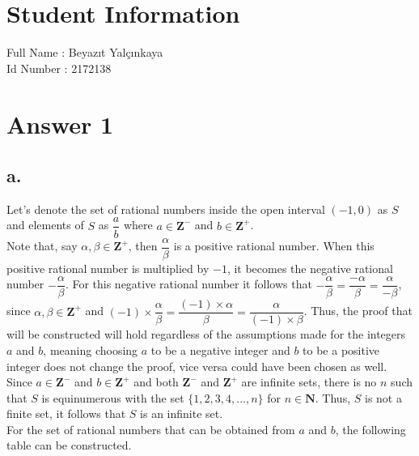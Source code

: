\documentclass[12pt]{article}
\begin{document}
\section*{Student Information } 
Full Name : Beyazıt Yalçınkaya \\
Id Number : 2172138 \\

\section*{Answer 1}

\subsection*{a.}
Let's denote the set of rational numbers inside the open interval $(-1, 0)$ as $S$ and elements of $S$ as $\dfrac{a}{b}$ where $a \in \mathbf{Z}^{-}$ and $b \in \mathbf{Z}^{+}$. \\
Note that, say $\alpha, \beta \in \mathbf{Z}^{+}$, then $\dfrac{\alpha}{\beta}$ is a positive rational number. When this positive rational number is multiplied by $-1$, it becomes the negative rational number $-\dfrac{\alpha}{\beta}$. For this negative rational  number it follows that $-\dfrac{\alpha}{\beta} = \dfrac{-\alpha}{\beta} = \dfrac{\alpha}{-\beta}$, since $\alpha, \beta \in \mathbf{Z}^{+}$ and $(-1) \times \dfrac{\alpha}{\beta} = \dfrac{(-1) \times \alpha}{\beta} = \dfrac{\alpha}{(-1) \times \beta}$. Thus, the proof that will be constructed will hold regardless of the assumptions made for the integers $a$ and $b$, meaning choosing $a$ to be a negative integer and $b$ to be a positive integer does not change the proof, vice versa could have been chosen as well. \\
Since $a \in \mathbf{Z}^{-}$ and $b \in \mathbf{Z}^{+}$ and both $\mathbf{Z}^{-}$ and $\mathbf{Z}^{+}$ are infinite sets, there is no $n$ such that $S$ is equinumerous with the set $\{1, 2, 3, 4, ..., n\}$ for $n \in \mathbf{N}$. Thus, $S$ is not a finite set, it follows that $S$ is an infinite set.\\
For the set of rational numbers that can be obtained from $a$ and $b$, the following table can be constructed.
\end{document}
